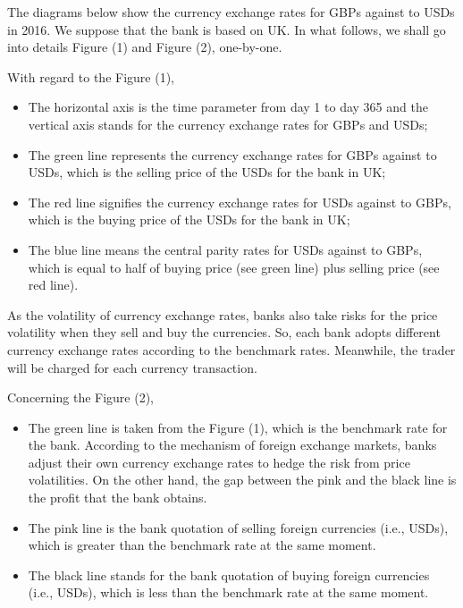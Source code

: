 \documentclass[11pt]{article}
\numberwithin{equation}{section}
\begin{document}
 The diagrams below show the currency exchange rates for GBPs against to USDs in 2016. We suppose that the bank is based on UK. In what follows, we shall go into 
 details Figure (1) and Figure (2), one-by-one. 

With regard to the  Figure (1),
\begin{itemize}
	\item The horizontal axis is the time parameter from   day 1 to  day 365
and 	the vertical axis stands for the currency exchange rates for GBPs and USDs;
	
	\item The green line represents the currency exchange rates for GBPs against to USDs, which is the selling price of the USDs for the bank in UK;
	
	\item The red line signifies the currency exchange rates for USDs against to GBPs, which is the buying price of the USDs for the bank in UK;
	
	\item The blue line means the central parity  rates for USDs against to GBPs, which is equal to half of  buying price (see green line) plus selling price (see red line).
	\end{itemize}
		
	As the volatility of currency exchange rates,   banks  also take  risks for the price volatility when they sell and buy the currencies. So,  each bank adopts different currency exchange rates according to the benchmark rates. Meanwhile,  the trader will be charged  for each currency transaction.
	
	Concerning the Figure (2), 
	\begin{itemize}	
	\item  The green line is taken from the Figure (1), which is the benchmark rate  for the bank. According to  the mechanism of foreign exchange markets, banks adjust their own currency exchange rates to hedge the risk from price volatilities. On the other hand, the gap between the pink  and the black line is the profit that   the bank   obtains.
	
	\item  The pink line is the bank quotation of selling foreign currencies (i.e., USDs), which is greater than the benchmark rate at the same moment. 
	
	\item  The black line stands for the bank quotation of buying  foreign currencies (i.e., USDs), which is less than    the benchmark rate at the same moment.	
\end{itemize}
\end{document}
